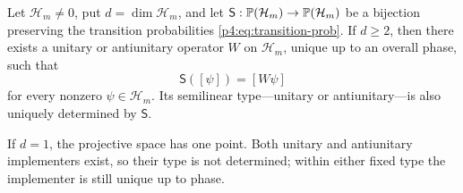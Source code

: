 \documentclass[12pt,a4paper]{article}
\begin{document}
\begin{theorem}
\label{p4:thm:wigner-finite}
Let \(\mathcal H_m\ne0\), put \(d=\dim\mathcal H_m\), and let
\(\mathsf S:\mathbb{P}(\mathcal H_m)\to\mathbb{P}(\mathcal H_m)\) be a bijection preserving
the transition probabilities \eqref{p4:eq:transition-prob}.  If \(d\ge2\),
then there exists a unitary or antiunitary operator \(W\) on
\(\mathcal H_m\), unique up to an overall phase, such that
\begin{equation}
\label{p4:eq:wigner-implementer}
\mathsf S([\psi])=[W\psi]
\end{equation}
for every nonzero \(\psi\in\mathcal H_m\).  Its semilinear type---unitary or
antiunitary---is also uniquely determined by \(\mathsf S\).

If \(d=1\), the projective space has one point.  Both unitary and antiunitary
implementers exist, so their type is not determined; within either fixed type
the implementer is still unique up to phase.
\end{theorem}
\end{document}
